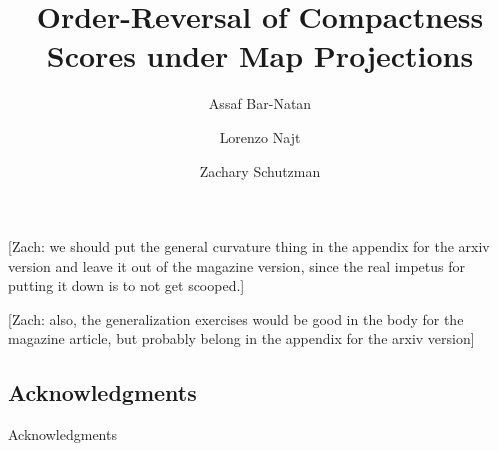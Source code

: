 \documentclass{article}
\title{Order-Reversal of Compactness Scores under Map Projections}
\author{Assaf Bar-Natan \and Lorenzo Najt \and Zachary Schutzman }
\theoremstyle{definition}
\theoremstyle{remark}
\newif \ifdraft \drafttrue
\newcommand{\zs}[1]{\ifdraft \textcolor{RedViolet}{[Zach: #1]} \fi}
\begin{document}
\maketitle
\begin{abstract}

\end{abstract}
\ifarxiv
\else
\fi

\zs{we should put the general curvature thing in the appendix for the arxiv version and leave it out of the magazine version, since the real impetus for putting it down is to not get scooped.}

\zs{also, the generalization exercises would be good in the body for the magazine article, but probably belong in the appendix for the arxiv version}









%


%










\ifarxiv
\subsection*{Acknowledgments}


\else

\begin{acknowledgment}{Acknowledgments}

\end{acknowledgment}
\fi




\pagebreak
\appendix


\end{document}
